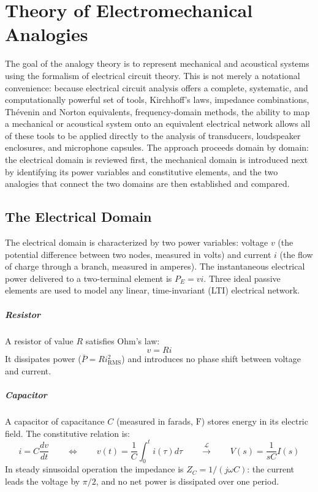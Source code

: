 
\graphicspath{{00_Images/02_chapter/}}

\chapter{Theory of Electromechanical Analogies}

The goal of the analogy theory is to represent mechanical and acoustical systems using the formalism of electrical circuit theory. This is not merely a notational convenience: because electrical circuit analysis offers a complete, systematic, and computationally powerful set of tools, Kirchhoff's laws, impedance combinations, Thévenin and Norton equivalents, frequency-domain methods, the ability to map a mechanical or acoustical system onto an equivalent electrical network allows all of these tools to be applied directly to the analysis of transducers, loudspeaker enclosures, and microphone capsules. The approach proceeds domain by domain: the electrical domain is reviewed first, the mechanical domain is introduced next by identifying its power variables and constitutive elements, and the two analogies that connect the two domains are then established and compared.

\section{The Electrical Domain}

The electrical domain is characterized by two power variables: voltage \(v\) (the potential difference between two nodes, measured in volts) and current \(i\) (the flow of charge through a branch, measured in amperes). The instantaneous electrical power delivered to a two-terminal element is \(P_E = v i\). Three ideal passive elements are used to model any linear, time-invariant (LTI) electrical network.

\paragraph{Resistor} A resistor of value \(R\) satisfies Ohm's law:
\[
v = R i
\]
It dissipates power (\(\bar P = R i_{\mathrm{RMS}}^2\)) and introduces no phase shift between voltage and current.

\paragraph{Capacitor} A capacitor of capacitance \(C\) (measured in farads, \(\si{\farad}\)) stores energy in its electric field. The constitutive relation is:
\[
i = C \frac{dv}{dt}
\qquad\Leftrightarrow\qquad
v(t) = \frac{1}{C}\int_0^t i(\tau) d\tau
\qquad\xrightarrow{\ \mathcal{L}\ }\qquad
V(s) = \frac{1}{sC} I(s)
\]
In steady sinusoidal operation the impedance is \(Z_C = 1/(j\omega C)\): the current leads the voltage by \(\pi/2\), and no net power is dissipated over one period.

